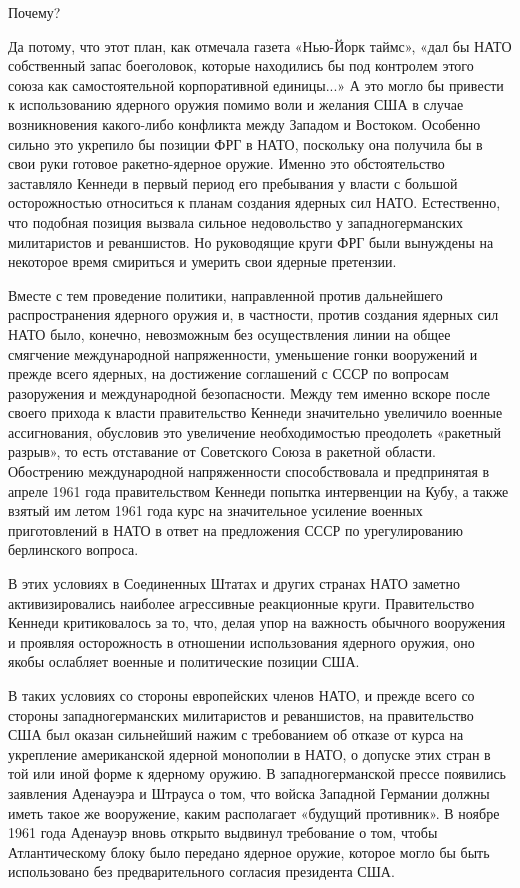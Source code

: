 \documentclass[12pt, a4paper, openany]{book}
\begin{document}
	Почему?
	
	Да потому, что этот план, как отмечала газета «Нью-Йорк таймс», «дал бы НАТО собственный запас боеголовок, которые находились бы под контролем этого союза как самостоятельной корпоративной единицы...» А это могло бы привести к использованию ядерного оружия помимо воли и желания США в случае возникновения какого-либо конфликта между Западом и Востоком. Особенно сильно это укрепило бы позиции ФРГ в НАТО, поскольку она получила бы в свои руки готовое ракетно-ядерное оружие. Именно это обстоятельство заставляло Кеннеди в первый период его пребывания у власти с большой осторожностью относиться к планам создания ядерных сил НАТО. Естественно, что подобная позиция вызвала сильное недовольство у западногерманских милитаристов и реваншистов. Но руководящие круги ФРГ были вынуждены на некоторое время смириться и умерить свои ядерные претензии.
	
	Вместе с тем проведение политики, направленной против дальнейшего распространения ядерного оружия и, в частности, против создания ядерных сил НАТО было, конечно, невозможным без осуществления линии на общее смягчение международной напряженности, уменьшение гонки вооружений и прежде всего ядерных, на достижение соглашений с СССР по вопросам разоружения и международной безопасности. Между тем именно вскоре после своего прихода к власти правительство Кеннеди значительно увеличило военные ассигнования, обусловив это увеличение необходимостью преодолеть «ракетный разрыв», то есть отставание от Советского Союза в ракетной области. Обострению международной напряженности способствовала и предпринятая в апреле 1961 года правительством Кеннеди попытка интервенции на Кубу, а также взятый им летом 1961 года курс на значительное усиление военных приготовлений в НАТО в ответ на предложения СССР по урегулированию берлинского вопроса.
	
	В этих условиях в Соединенных Штатах и других странах НАТО заметно активизировались наиболее агрессивные реакционные круги. Правительство Кеннеди критиковалось за то, что, делая упор на важность обычного вооружения и проявляя осторожность в отношении использования ядерного оружия, оно якобы ослабляет военные и политические позиции США.
	
	В таких условиях со стороны европейских членов НАТО, и прежде всего со стороны западногерманских милитаристов и реваншистов, на правительство США был оказан сильнейший нажим с требованием об отказе от курса на укрепление американской ядерной монополии в НАТО, о допуске этих стран в той или иной форме к ядерному оружию. В западногерманской прессе появились заявления Аденауэра и Штрауса о том, что войска Западной Германии должны иметь такое же вооружение, каким располагает «будущий противник». В ноябре 1961 года Аденауэр вновь открыто выдвинул требование о том, чтобы Атлантическому блоку было передано ядерное оружие, которое могло бы быть использовано без предварительного согласия президента США.
	
\end{document}

